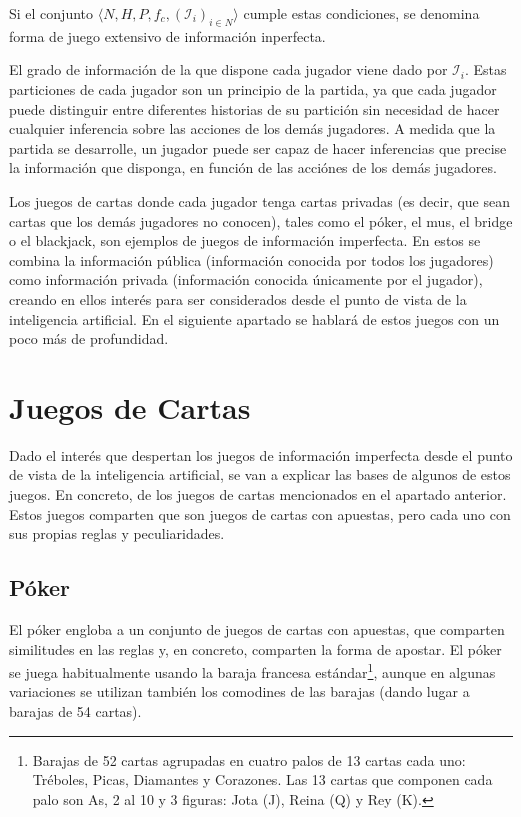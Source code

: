 Si el conjunto $\langle N,H,P, f_c,(\mathcal{I}_i)_{i \in N}\rangle$ cumple estas condiciones, se denomina forma de juego extensivo de información inperfecta. \cite{Gametheory}

El grado de información de la que dispone cada jugador viene dado por $\mathcal{I}_i$. Estas particiones de cada jugador son un principio de la partida, ya que cada jugador puede  distinguir entre diferentes historias de su partición sin necesidad de hacer cualquier inferencia sobre las acciones de los demás jugadores. A medida que la partida se desarrolle, un jugador puede ser capaz de hacer inferencias que precise la información que disponga, en función de las acciónes de los demás jugadores.\cite{Gametheory}

Los juegos de cartas donde cada jugador tenga cartas privadas (es decir, que sean cartas que los demás jugadores no conocen), tales como el póker, el mus, el bridge o el blackjack, son ejemplos de juegos de información imperfecta. En estos se combina la información pública (información conocida por todos los jugadores) como información privada (información conocida únicamente por el jugador), creando en ellos interés para ser considerados desde el punto de vista de la inteligencia artificial. En el siguiente apartado se hablará de estos juegos con un poco más de profundidad.

\section{Juegos de Cartas}
\label{sec:cartas}

Dado el interés que despertan los juegos de información imperfecta desde el punto de vista de la inteligencia artificial, se van a explicar las bases de algunos de estos juegos. En concreto, de los juegos de cartas mencionados en el apartado anterior. Estos juegos comparten que son juegos de cartas con apuestas, pero cada uno con sus propias reglas y peculiaridades.

\subsection{Póker}

El póker engloba a un conjunto de juegos de cartas con apuestas, que comparten similitudes en las reglas y, en concreto, comparten la forma de apostar. El póker se juega habitualmente usando la baraja francesa estándar\footnote{Barajas de 52 cartas agrupadas en cuatro palos de 13 cartas cada uno: Tréboles, Picas, Diamantes y Corazones. Las 13 cartas que componen cada palo son As, 2 al 10 y 3 figuras: Jota (J), Reina (Q) y Rey (K).}, aunque en algunas variaciones se utilizan también los comodines de las barajas (dando lugar a barajas de 54 cartas). 

